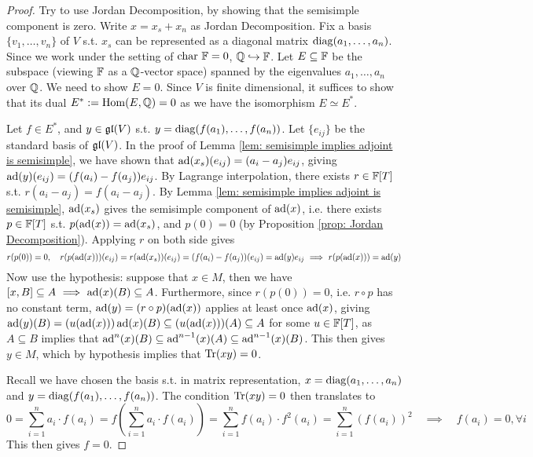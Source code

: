 \documentclass{article}
\begin{document}
\begin{proof}
    Try to use Jordan Decomposition, by showing that the semisimple component is zero. Write $x = x_s + x_n$ as Jordan Decomposition. Fix a basis $\{ v_1, \dots, v_n \}$ of $V$ s.t. $x_s$ can be represented as a diagonal matrix $\operatorname{diag}( a_1, \dots, a_n )$. Since we work under the setting of $\mathrm{char}\ {\mathbb{F}} = 0$, $\mathbb{Q} \hookrightarrow \mathbb{F}$. Let $E \subseteq \mathbb{F}$ be the subspace (viewing $\mathbb{F}$ as a $\mathbb{Q}$-vector space) spanned by the eigenvalues $a_1, \dots, a_n$ over $\mathbb{Q}$. We need to show $E = 0$. Since $V$ is finite dimensional, it suffices to show that its dual $E^* := \mathrm{Hom}(E, \mathbb{Q}) = 0$ as we have the isomorphism $E \simeq E^*$.

    Let $f \in E^*$, and $y \in \mathfrak{gl}(V)$ s.t. $y = \operatorname{diag}(f(a_1), \dots, f(a_n))$. Let $\{ e_{ij} \}$ be the standard basis of $\mathfrak{gl}(V)$. In the proof of Lemma \ref{lem: semisimple implies adjoint is semisimple}, we have shown that $\operatorname{ad}(x_s)(e_{ij}) = (a_i - a_j) e_{ij}$, giving $\operatorname{ad}(y)(e_{ij}) = (f(a_i) - f(a_j))e_{ij}$. By Lagrange interpolation, there exists $r \in \mathbb{F}[T]$ s.t. $r(a_i - a_j) = f(a_i - a_j)$. By Lemma \ref{lem: semisimple implies adjoint is semisimple}, $\operatorname{ad}(x_s)$ gives the semisimple component of $\operatorname{ad}(x)$, i.e. there exists $p \in \mathbb{F}[T]$ s.t. $p(\operatorname{ad}(x)) = \operatorname{ad}(x_s)$, and $p(0) = 0$ (by Proposition \ref{prop: Jordan Decomposition}). Applying $r$ on both side gives
    \[
        r(p(0)) = 0, \quad r(p(\operatorname{ad}(x)))(e_{ij}) = r(\operatorname{ad}(x_s))(e_{ij}) = (f(a_i) - f(a_j))(e_{ij}) = \operatorname{ad}(y)e_{ij} \ \Longrightarrow\  r(p(\operatorname{ad}(x))) = \operatorname{ad}(y)
    \]
    Now use the hypothesis: suppose that $x \in M$, then we have $[x, B] \subseteq A \ \Longrightarrow\  \operatorname{ad}(x)(B) \subseteq A$. Furthermore, since $r(p(0)) = 0$, i.e. $r \circ p$ has no constant term, $\operatorname{ad}(y) = (r \circ p)(\operatorname{ad}(x))$ applies at least once $\operatorname{ad}(x)$, giving $\operatorname{ad}(y)(B) = (u(\operatorname{ad}(x)))\operatorname{ad}(x)(B) \subseteq (u(\operatorname{ad}(x)))(A) \subseteq A$ for some $u \in \mathbb{F}[T]$, as $A \subseteq B$ implies that $\operatorname{ad}^n(x)(B) \subseteq \operatorname{ad}^{n-1}(x)(A) \subseteq \operatorname{ad}^{n-1}(x)(B)$. This then gives $y \in M$, which by hypothesis implies that $\operatorname{Tr}(xy) = 0$.

    Recall we have chosen the basis s.t. in matrix representation, $x = \operatorname{diag}(a_1, \dots, a_n)$ and $y = \operatorname{diag}(f(a_1), \dots, f(a_n))$. The condition $\operatorname{Tr}(xy) = 0$ then translates to 
    \[
        0 = \sum_{i = 1}^n a_i \cdot f(a_i) = f\left( \sum_{i = 1}^n a_i \cdot f(a_i) \right) = \sum_{i = 1}^n f(a_i) \cdot f^2(a_i) = \sum_{i = 1}^n (f(a_i))^2 \quad \implies \quad f(a_i) = 0, \forall i
    \]
    This then gives $f = 0$.
\end{proof}
\end{document}
